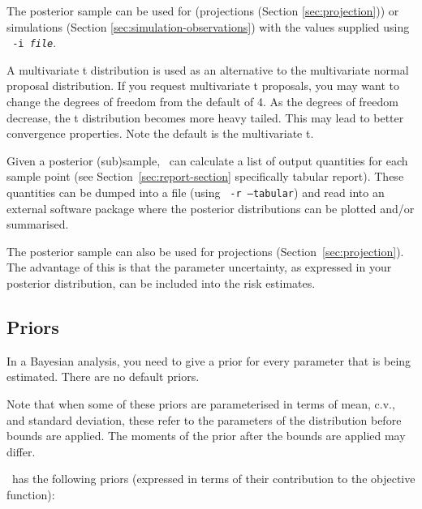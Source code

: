 The posterior sample can be used for (projections (Section \ref{sec:projection})) or simulations (Section \ref{sec:simulation-observations}) with the values supplied using \texttt{\cname\ -i \emph{file}}.

A multivariate t distribution is used as an alternative to the multivariate normal proposal distribution. If you request multivariate t proposals, you may want to change the degrees of freedom from the default of 4. As the degrees of freedom decrease, the t distribution becomes more heavy tailed. This may lead to better convergence properties. Note the default is the multivariate t.

Given a posterior (sub)sample, \CNAME\ can calculate a list of output quantities for each sample point (see Section~\ref{sec:report-section} specifically tabular report). These quantities can be dumped into a file (using \texttt{\cname\ -r --tabular}) and read into an external software package where the posterior distributions can be plotted and/or summarised.

The posterior sample can also be used for projections (Section~\ref{sec:projection}). The advantage of this is that the parameter uncertainty, as expressed in your posterior distribution, can be included into the risk estimates.

\subsection{Priors\label{sec:priors}}

In a Bayesian analysis, you need to give a prior for every parameter that is being estimated. There are no default priors.

Note that when some of these priors are parameterised in terms of mean, c.v., and standard deviation, these refer to the parameters of the distribution before bounds are applied. The moments of the prior after the bounds are applied may differ.

\CNAME\ has the following priors (expressed in terms of their contribution to the objective function):

